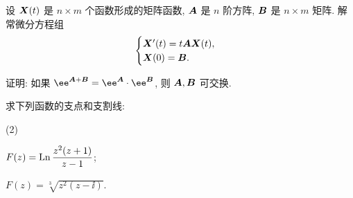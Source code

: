 \begin{homework}
\begin{homework}
\begin{subhomework}[after-item-skip=3pt]
      \end{subhomework}
    \item \optionalex 设 ${\boldsymbol{X}}(t)$ 是 $n\times m$ 个函数形成的矩阵函数, ${\boldsymbol{A}}$ 是 $n$ 阶方阵, ${\boldsymbol{B}}$ 是 $n\times m$ 矩阵. 解常微分方程组
      \[
        \begin{cases}
          {\boldsymbol{X}}'(t)=t{\boldsymbol{A}}{\boldsymbol{X}}(t),\\
          {\boldsymbol{X}}(0)={\boldsymbol{B}}.
        \end{cases}
      \]
    \item \optionalex 证明: 如果 $\ee^{\bfA+\bfB}=\ee^\bfA\cdot \ee^\bfB$, 则 ${\boldsymbol{A}},{\boldsymbol{B}}$ 可交换.
    \item \optionalex 求下列函数的支点和支割线:
      \begin{subhomework}(2)
        \item $F(z)=\operatorname{Ln}\dfrac{z^2(z+1)}{z-1}$;
        \item $F(z)=\sqrt[3]{z^2(z-\ii)}$.
      \end{subhomework}
  \end{homework}
\end{homework}
  

